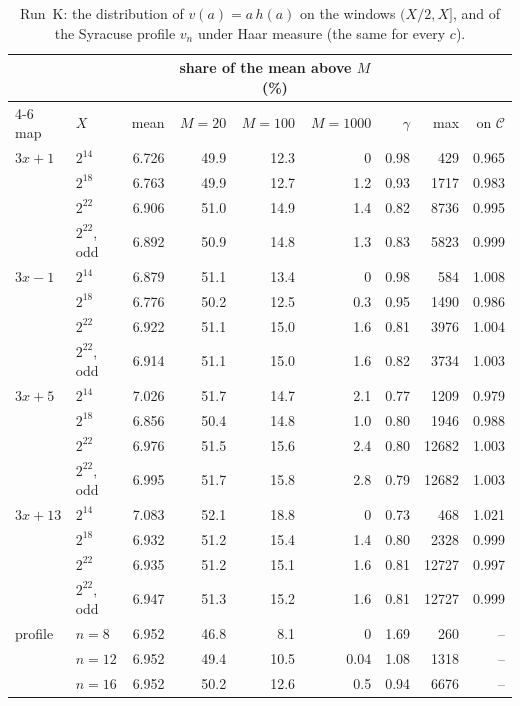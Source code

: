 \documentclass[12pt]{amsart}
\theoremstyle{definition}
\theoremstyle{remark}
\begin{document}
\begin{table}[tp]
\centering
\small
\begin{tabular}{@{}llrrrrrrr@{}}
\toprule
 & & & \multicolumn{3}{c}{share of the mean above $M$ (\%)} & & & \\
\cmidrule(lr){4-6}
map & $X$ & mean & $M=20$ & $M=100$ & $M=1000$ & $\gamma$ & max & on $\mathcal C$ \\
\midrule
$3x+1$ & $2^{14}$ & 6.726 & 49.9 & 12.3 & 0 & 0.98 & 429 & 0.965 \\
 & $2^{18}$ & 6.763 & 49.9 & 12.7 & 1.2 & 0.93 & 1717 & 0.983 \\
 & $2^{22}$ & 6.906 & 51.0 & 14.9 & 1.4 & 0.82 & 8736 & 0.995 \\
 & $2^{22}$, odd & 6.892 & 50.9 & 14.8 & 1.3 & 0.83 & 5823 & 0.999 \\
\addlinespace
$3x-1$ & $2^{14}$ & 6.879 & 51.1 & 13.4 & 0 & 0.98 & 584 & 1.008 \\
 & $2^{18}$ & 6.776 & 50.2 & 12.5 & 0.3 & 0.95 & 1490 & 0.986 \\
 & $2^{22}$ & 6.922 & 51.1 & 15.0 & 1.6 & 0.81 & 3976 & 1.004 \\
 & $2^{22}$, odd & 6.914 & 51.1 & 15.0 & 1.6 & 0.82 & 3734 & 1.003 \\
\addlinespace
$3x+5$ & $2^{14}$ & 7.026 & 51.7 & 14.7 & 2.1 & 0.77 & 1209 & 0.979 \\
 & $2^{18}$ & 6.856 & 50.4 & 14.8 & 1.0 & 0.80 & 1946 & 0.988 \\
 & $2^{22}$ & 6.976 & 51.5 & 15.6 & 2.4 & 0.80 & 12682 & 1.003 \\
 & $2^{22}$, odd & 6.995 & 51.7 & 15.8 & 2.8 & 0.79 & 12682 & 1.003 \\
\addlinespace
$3x+13$ & $2^{14}$ & 7.083 & 52.1 & 18.8 & 0 & 0.73 & 468 & 1.021 \\
 & $2^{18}$ & 6.932 & 51.2 & 15.4 & 1.4 & 0.80 & 2328 & 0.999 \\
 & $2^{22}$ & 6.935 & 51.2 & 15.1 & 1.6 & 0.81 & 12727 & 0.997 \\
 & $2^{22}$, odd & 6.947 & 51.3 & 15.2 & 1.6 & 0.81 & 12727 & 0.999 \\
\addlinespace
profile & $n=8$ & 6.952 & 46.8 & 8.1 & 0 & 1.69 & 260 & -- \\
 & $n=12$ & 6.952 & 49.4 & 10.5 & 0.04 & 1.08 & 1318 & -- \\
 & $n=16$ & 6.952 & 50.2 & 12.6 & 0.5 & 0.94 & 6676 & -- \\
\bottomrule
\end{tabular}
\caption{Run~K: the distribution of $v(a)=a\,h(a)$ on the windows $(X/2,X]$, and of the Syracuse profile $v_n$ under Haar measure (the same for every $c$).}
\label{table:ui}
\end{table}
\end{document}
